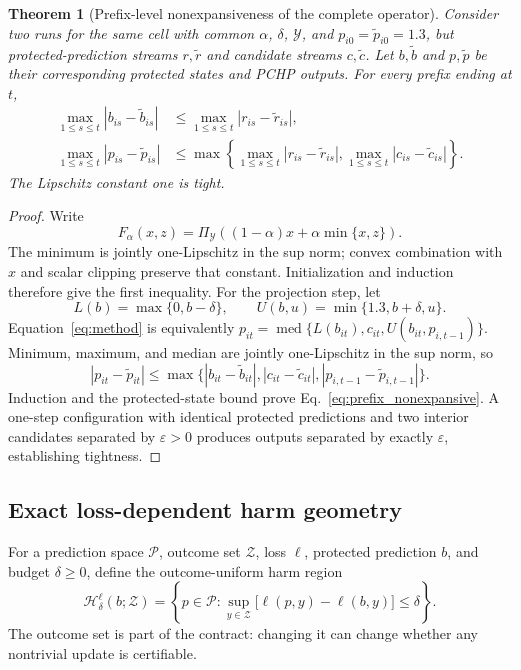 \documentclass[11pt]{article}
\newtheorem{theorem}{Theorem}
\begin{document}
\begin{theorem}[Prefix-level nonexpansiveness of the complete operator]
\label{thm:nonexpansive}
Consider two runs for the same cell with common $\alpha$, $\delta$, $\mathcal Y$, and $p_{i0}=\widetilde p_{i0}=1.3$, but protected-prediction streams $r,\widetilde r$ and candidate streams $c,\widetilde c$. Let $b,\widetilde b$ and $p,\widetilde p$ be their corresponding protected states and PCHP outputs. For every prefix ending at $t$,
\begin{align}
  \max_{1\leq s\leq t}|b_{is}-\widetilde b_{is}|
  &\leq \max_{1\leq s\leq t}|r_{is}-\widetilde r_{is}|,\\
  \max_{1\leq s\leq t}|p_{is}-\widetilde p_{is}|
  &\leq
  \max\!\left\{
  \max_{1\leq s\leq t}|r_{is}-\widetilde r_{is}|,
  \max_{1\leq s\leq t}|c_{is}-\widetilde c_{is}|
  \right\}.
  \label{eq:prefix_nonexpansive}
\end{align}
The Lipschitz constant one is tight.
\end{theorem}
\begin{proof}
Write
\[
F_\alpha(x,z)=\Pi_{\mathcal Y}\!\left((1-\alpha)x+\alpha\min\{x,z\}\right).
\]
The minimum is jointly one-Lipschitz in the sup norm; convex combination with $x$ and scalar clipping preserve that constant. Initialization and induction therefore give the first inequality. For the projection step, let
\[
L(b)=\max\{0,b-\delta\},\qquad
U(b,u)=\min\{1.3,b+\delta,u\}.
\]
Equation~\eqref{eq:method} is equivalently $p_{it}=\operatorname{med}\{L(b_{it}),c_{it},U(b_{it},p_{i,t-1})\}$. Minimum, maximum, and median are jointly one-Lipschitz in the sup norm, so
\[
|p_{it}-\widetilde p_{it}|
\leq \max\{|b_{it}-\widetilde b_{it}|,
|c_{it}-\widetilde c_{it}|,
|p_{i,t-1}-\widetilde p_{i,t-1}|\}.
\]
Induction and the protected-state bound prove Eq.~\eqref{eq:prefix_nonexpansive}. A one-step configuration with identical protected predictions and two interior candidates separated by $\varepsilon>0$ produces outputs separated by exactly $\varepsilon$, establishing tightness.
\end{proof}

\subsection{Exact loss-dependent harm geometry}

For a prediction space $\mathcal P$, outcome set $\mathcal Z$, loss $\ell$, protected prediction $b$, and budget $\delta\geq0$, define the outcome-uniform harm region
\begin{equation}
  \mathcal H^{\ell}_{\delta}(b;\mathcal Z)
  =\left\{p\in\mathcal P:
  \sup_{y\in\mathcal Z}\bigl[\ell(p,y)-\ell(b,y)\bigr]\leq\delta
  \right\}.
  \label{eq:generic_harm_region}
\end{equation}
The outcome set is part of the contract: changing it can change whether any nontrivial update is certifiable.
\end{document}
